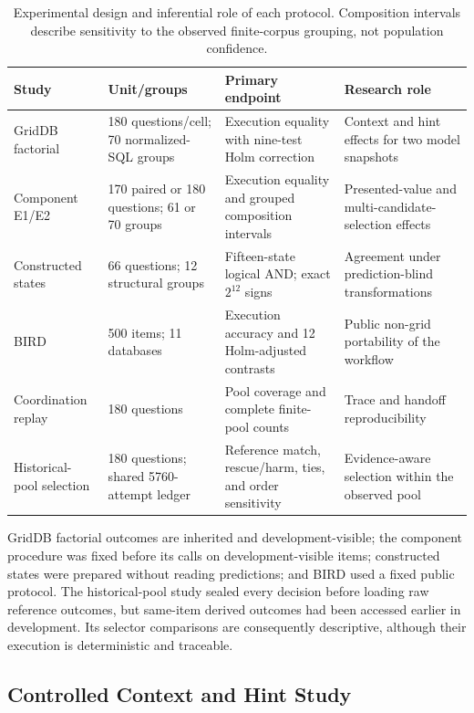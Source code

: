 \documentclass[information,article,submit,moreauthors]{Definitions/mdpi}
\begin{document}
\begin{table}[htbp]
\caption{Experimental design and inferential role of each protocol. Composition intervals describe sensitivity to the observed finite-corpus grouping, not population confidence.}
\label{tab:protocol-master}\centering\scriptsize
\setlength{\tabcolsep}{3pt}
\begin{tabular}{p{2.3cm}p{2.6cm}p{3.2cm}p{4.3cm}}
\toprule
Study & Unit/groups & Primary endpoint & Research role\\
\midrule
GridDB factorial & 180 questions/cell; 70 normalized-SQL groups & Execution equality with nine-test Holm correction & Context and hint effects for two model snapshots\\
Component E1/E2 & 170 paired or 180 questions; 61 or 70 groups & Execution equality and grouped composition intervals & Presented-value and multi-candidate-selection effects\\
Constructed states & 66 questions; 12 structural groups & Fifteen-state logical AND; exact $2^{12}$ signs & Agreement under prediction-blind transformations\\
BIRD & 500 items; 11 databases & Execution accuracy and 12 Holm-adjusted contrasts & Public non-grid portability of the workflow\\
Coordination replay & 180 questions & Pool coverage and complete finite-pool counts & Trace and handoff reproducibility\\
Historical-pool selection & 180 questions; shared 5760-attempt ledger & Reference match, rescue/harm, ties, and order sensitivity & Evidence-aware selection within the observed pool\\
\bottomrule
\end{tabular}
\end{table}

GridDB factorial outcomes are inherited and development-visible; the component procedure was fixed before its calls on development-visible items; constructed states were prepared without reading predictions; and BIRD used a fixed public protocol. The historical-pool study sealed every decision before loading raw reference outcomes, but same-item derived outcomes had been accessed earlier in development. Its selector comparisons are consequently descriptive, although their execution is deterministic and traceable.

\subsection{Controlled Context and Hint Study}
\end{document}
